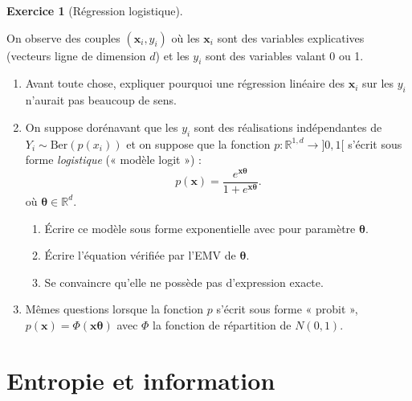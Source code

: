 \documentclass[
  10,
  letterpaper,
  DIV=11,
  numbers=noendperiod]{scrreport}
\providecommand{\tightlist}{%
  \setlength{\itemsep}{0pt}\setlength{\parskip}{0pt}}\usepackage{longtable,booktabs,array}
\newcommand{\bx}{\mathbf{x}}
\newcommand{\bt}{\boldsymbol{\theta}}
\theoremstyle{plain}
\theoremstyle{definition}
\newtheorem{exercise}{Exercice}[chapter]
\theoremstyle{plain}
\theoremstyle{definition}
\theoremstyle{definition}
\theoremstyle{plain}
\theoremstyle{remark}
\begin{document}
\begin{exercise}[Régression
logistique]\protect\hypertarget{exr-logistique}{}\label{exr-logistique}

On observe des couples \((\bx_i, y_i)\) où les \(\bx_i\) sont des
variables explicatives (vecteurs ligne de dimension \(d\)) et les
\(y_i\) sont des variables valant 0 ou 1.

\begin{enumerate}
\def\labelenumi{\arabic{enumi}.}
\tightlist
\item
  Avant toute chose, expliquer pourquoi une régression linéaire des
  \(\bx_i\) sur les \(y_i\) n'aurait pas beaucoup de sens.
\item
  On suppose dorénavant que les \(y_i\) sont des réalisations
  indépendantes de \(Y_i \sim \mathrm{Ber}(p(x_i))\) et on suppose que
  la fonction \(p : \mathbb{R}^{1,d}\to]0,1[\) s'écrit sous forme
  \emph{logistique} (« modèle logit ») :
  \[p(\bx) = \frac{e^{\bx \bt}}{1 + e^{\bx \bt}}. \] où
  \(\bt \in \mathbb{R}^d\).

  \begin{enumerate}
  \def\labelenumii{\roman{enumii})}
  \tightlist
  \item
    Écrire ce modèle sous forme exponentielle avec pour paramètre
    \(\bt\).
  \item
    Écrire l'équation vérifiée par l'EMV de \(\bt\).
  \item
    Se convaincre qu'elle ne possède pas d'expression exacte.
  \end{enumerate}
\item
  Mêmes questions lorsque la fonction \(p\) s'écrit sous forme « probit
  », \(p(\bx) = \Phi(\bx \bt)\) avec \(\Phi\) la fonction de répartition
  de \(N(0,1)\).
\end{enumerate}

\end{exercise}


\hypertarget{entropie-et-information}{%
\chapter{Entropie et information}\label{entropie-et-information}}
\end{document}
